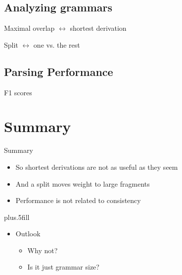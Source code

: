 \documentclass{beamer}
\begin{document}
\subsection{Analyzing grammars}

\begin{frame}{Maximal overlap $\leftrightarrow$ shortest derivation}
\end{frame}

\begin{frame}{Split $\leftrightarrow$ one vs. the rest}
\end{frame}

\subsection{Parsing Performance}
\begin{frame}{F1 scores}
\end{frame}


\section*{Summary}

\begin{frame}{Summary}

  \begin{itemize}
  \item
    So \alert{shortest derivations} are not as useful as they seem
  \item
    And a \alert{split} moves weight to large fragments
  \item
    \alert{Performance} is not related to \alert{consistency}
  \end{itemize}
  
  \vskip0pt plus.5fill
  \begin{itemize}
  \item
    Outlook
    \begin{itemize}
    \item
      Why not?
    \item
      Is it just grammar size?
    \end{itemize}
  \end{itemize}
\end{frame}





%
%
%
%    
%    
\end{document}
